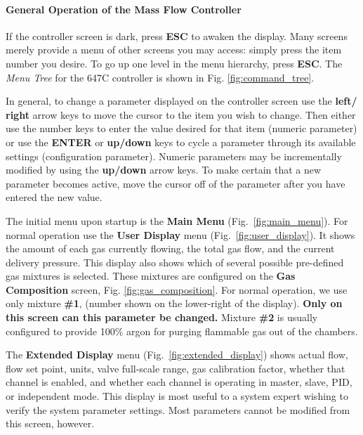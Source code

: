 {\paragraph{General Operation of the Mass Flow Controller}
If the controller screen is dark, press {\bf ESC} to awaken the
display.  Many screens merely provide a menu of other screens you may
access: simply press the item number you desire. To go up one level in
the menu hierarchy, press {\bf ESC}. The \emph{Menu Tree} for the 647C
controller is shown in Fig. \ref{fig:command_tree}.

In general, to change a parameter displayed on the controller screen
use the \textbf{left/ right} arrow keys to move the cursor to the item you
wish to change. Then either use the number keys to enter the value
desired for that item (numeric parameter) or use the {\bf ENTER} or
{\bf up/down} keys to cycle a parameter through its available settings
(configuration parameter). Numeric parameters may be incrementally
modified by using the {\bf up/down} arrow keys. To make certain that a
new parameter becomes active, move the cursor off of the parameter
after you have entered the new value.

The initial menu upon startup is the {\bf Main Menu}
(Fig.~\ref{fig:main_menu}).  For normal operation use the {\bf User
Display} menu (Fig.~\ref{fig:user_display}). It shows the amount of
each gas currently flowing, the total gas flow, and the current
delivery pressure. This display also shows which of several possible
pre-defined gas mixtures is selected. These mixtures are configured
on the {\bf Gas Composition} screen, Fig. \ref{fig:gas_composition}.
For normal operation, we use
only mixture {\bf \#1}, (number shown on the lower-right of the
display). {\bf Only on this screen can this parameter be changed.}
Mixture {\bf \#2} is usually configured to provide 100\% argon for
purging flammable gas out of the chambers.

The {\bf Extended Display} menu (Fig.~\ref{fig:extended_display})
shows actual flow, flow set point, units, valve full-scale range, gas
calibration factor, whether that channel is enabled, and whether each
channel is operating in master, slave, PID, or independent mode. This
display is most useful to a system expert wishing to verify the system
parameter settings.  Most parameters cannot be modified from this
screen, however.

}
